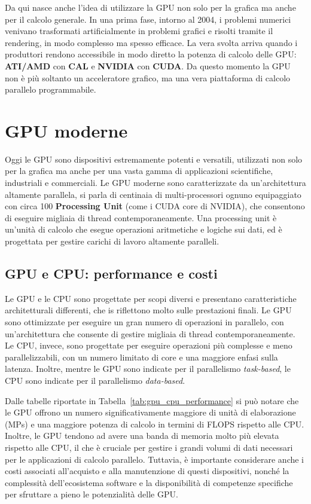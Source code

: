 Da qui nasce anche l'idea di utilizzare la GPU non solo per la grafica ma anche per il calcolo generale. In una prima fase, intorno al 2004, i problemi numerici venivano trasformati artificialmente in problemi grafici e risolti tramite il rendering, in modo complesso ma spesso efficace. La vera svolta arriva quando i produttori rendono accessibile in modo diretto la potenza di calcolo delle GPU: \textbf{ATI/AMD} con \textbf{CAL} e \textbf{NVIDIA} con \textbf{CUDA}. Da questo momento la GPU non è più soltanto un acceleratore grafico, ma una vera piattaforma di calcolo parallelo programmabile.

\section{GPU moderne}
Oggi le GPU sono dispositivi estremamente potenti e versatili, utilizzati non solo per la grafica ma anche per una vasta gamma di applicazioni scientifiche, industriali e commerciali. Le GPU moderne sono caratterizzate da un'architettura altamente parallela, si parla di centinaia di multi-processori ognuno equipaggiato con circa 100 \textbf{Processing Unit} (come i CUDA core di NVIDIA), che consentono di eseguire migliaia di thread contemporaneamente. Una processing unit è un'unità di calcolo che esegue operazioni aritmetiche e logiche sui dati, ed è progettata per gestire carichi di lavoro altamente paralleli.

\subsection{GPU e CPU: performance e costi}
Le GPU e le CPU sono progettate per scopi diversi e presentano caratteristiche architetturali differenti, che is riflettono molto sulle prestazioni finali. Le GPU sono ottimizzate per eseguire un gran numero di operazioni in parallelo, con un'architettura che consente di gestire migliaia di thread contemporaneamente. Le CPU, invece, sono progettate per eseguire operazioni più complesse e meno parallelizzabili, con un numero limitato di core e una maggiore enfasi sulla latenza. Inoltre, mentre le GPU sono indicate per il parallelismo \emph{task-based}, le CPU sono indicate per il parallelismo \emph{data-based}.

Dalle tabelle riportate in Tabella~\ref{tab:gpu_cpu_performance} si può notare che le GPU offrono un numero significativamente maggiore di unità di elaborazione (MPs) e una maggiore potenza di calcolo in termini di FLOPS rispetto alle CPU.
Inoltre, le GPU tendono ad avere una banda di memoria molto più elevata rispetto alle CPU, il che è cruciale per gestire i grandi volumi di dati necessari per le applicazioni di calcolo parallelo. Tuttavia, è importante considerare anche i costi associati all'acquisto e alla manutenzione di questi dispositivi, nonché la complessità dell'ecosistema software e la disponibilità di competenze specifiche per sfruttare a pieno le potenzialità delle GPU. 

